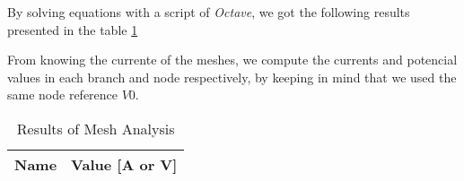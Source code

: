 By solving equations with a script of \textit{Octave}, we got the following results presented in the table \ref{tab:op_octave}

From knowing the currente of the meshes, we compute the currents and  potencial values in each branch and node respectively, by keeping in mind that we used the same node reference $V0$.


\begin{table}[h]
  \centering
  \begin{tabular}{|l|r|}
    \hline
    {\bf Name} & {\bf Value [A or V]} \\ \hline
    
  \end{tabular}
  \caption{Results of Mesh Analysis}
  \label{tab:op_octave}
\end{table}




